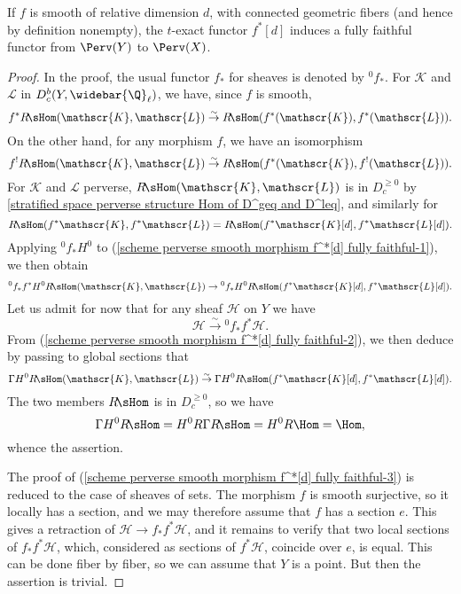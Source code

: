 \begin{proposition}\label{scheme perverse smooth morphism f^*[d] fully faithful}
If $f$ is smooth of relative dimension $d$, with connected geometric fibers (and hence by definition nonempty), the $t$-exact functor $f^*[d]$ induces a fully faithful functor from $\Perv(Y)$ to $\Perv(X)$.
\end{proposition}
\begin{proof}
In the proof, the usual functor $f_*$ for sheaves is denoted by ${^0f_*}$. For $\mathscr{K}$ and $\mathscr{L}$ in $D^b_c(Y,\widebar{\Q}_\ell)$, we have, since $f$ is smooth,
\begin{equation}\label{scheme perverse smooth morphism f^*[d] fully faithful-1}
f^*R\!\sHom(\mathscr{K},\mathscr{L})\stackrel{\sim}{\to} R\!\sHom(f^*(\mathscr{K}),f^*(\mathscr{L})).
\end{equation}
On the other hand, for any morphism $f$, we have an isomorphism
\[f^!R\!\sHom(\mathscr{K},\mathscr{L})\stackrel{\sim}{\to} R\!\sHom(f^*(\mathscr{K}),f^!(\mathscr{L})).\]
For $\mathscr{K}$ and $\mathscr{L}$ perverse, $R\!\sHom(\mathscr{K},\mathscr{L})$ is in $D^{\geq 0}_c$ by \cref{stratified space perverse structure Hom of D^geq and D^leq}, and similarly for
\[R\!\sHom(f^*\mathscr{K},f^*\mathscr{L})=R\!\sHom(f^*\mathscr{K}[d],f^*\mathscr{L}[d]).\]
Applying ${^0f_*H^0}$ to (\ref{scheme perverse smooth morphism f^*[d] fully faithful-1}), we then obtain
\begin{equation}\label{scheme perverse smooth morphism f^*[d] fully faithful-2}
{^0f_*}f^*H^0R\!\sHom(\mathscr{K},\mathscr{L})\to {^0f_*}H^0R\!\sHom(f^*\mathscr{K}[d],f^*\mathscr{L}[d]).
\end{equation}
Let us admit for now that for any sheaf $\mathscr{H}$ on $Y$ we have
\begin{equation}\label{scheme perverse smooth morphism f^*[d] fully faithful-3}
\mathscr{H}\stackrel{\sim}{\to} {^0f_*}f^*\mathscr{H}.
\end{equation}
From (\ref{scheme perverse smooth morphism f^*[d] fully faithful-2}), we then deduce by passing to global sections that
\[\Gamma H^0R\!\sHom(\mathscr{K},\mathscr{L})\stackrel{\sim}{\to} \Gamma H^0R\!\sHom(f^*\mathscr{K}[d],f^*\mathscr{L}[d]).\]
The two members $R\!\sHom$ is in $D^{\geq 0}_c$, so we have
\[\Gamma H^0R\!\sHom=H^0R\Gamma R\!\sHom=H^0R\Hom=\Hom,\]
whence the assertion.

The proof of (\ref{scheme perverse smooth morphism f^*[d] fully faithful-3}) is reduced to the case of sheaves of sets. The morphism $f$ is smooth surjective, so it locally has a section, and we may therefore assume that $f$ has a section $e$. This gives a retraction of $\mathscr{H}\to f_*f^*\mathscr{H}$, and it remains to verify that two local sections of $f_*f^*\mathscr{H}$, which, considered as sections of $f^*\mathscr{H}$, coincide over $e$, is equal. This can be done fiber by fiber, so we can assume that $Y$ is a point. But then the assertion is trivial.
\end{proof}

